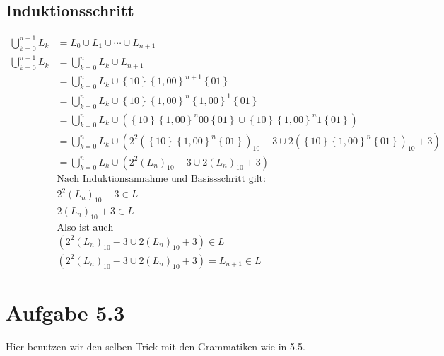 \documentclass{article}
\begin{document}
\subsection*{Induktionsschritt}
\begin{align*}%
\bigcup_{k=0}^{n+1} L_k &= L_0 \cup L_1 \cup \cdots \cup L_{n+1} \\
\bigcup_{k=0}^{n+1} L_k &= \bigcup_{k=0}^{n} L_k \cup L_{n+1} \\
&= \bigcup_{k=0}^{n} L_k \cup \left\{10 \right\} \left\{1,00 \right\}^{n+1} \left\{ 01 \right\} \\
&= \bigcup_{k=0}^{n} L_k \cup \left\{10 \right\} \left\{1,00 \right\}^n \left\{ 1,00 \right\}^1 \left\{ 01 \right\} \\
&= \bigcup_{k=0}^{n} L_k \cup \left( \left\{ 10 \right\} \left\{ 1,00 \right\}^n 00 \left\{ 01 \right\} \cup \left\{ 10 \right\} \left\{ 1,00 \right\}^n 1 \left\{ 01 \right\}  \right) \\
&= \bigcup_{k=0}^{n} L_k \cup \left( 2^2 \left( \left\{ 10 \right\} \left\{ 1,00 \right\}^n \left\{ 01 \right\} \right)_{10} - 3 \cup 2 \left( \left\{10\right\} \left\{1,00\right\}^n \left\{01\right\} \right)_{10} + 3 \right)\\
&= \bigcup_{k=0}^{n} L_k \cup \left( 2^2 \left( L_n \right)_{10} - 3 \cup 2 \left( L_n \right)_{10} + 3 \right) \\
&\text{Nach Induktionsannahme und Basissschritt gilt: } \\
&2^2 \left( L_n \right)_{10} - 3 \in L \\
&2 \left( L_n \right)_{10} + 3 \in L \\
&\text{Also ist auch } \\
&\left( 2^2 \left( L_n \right)_{10} - 3 \cup 2 \left( L_n \right)_{10} + 3 \right) \in L\\
&\left( 2^2 \left( L_n \right)_{10} - 3 \cup 2 \left( L_n \right)_{10} + 3 \right) = L_{n+1} \in L
\end{align*}

\section*{Aufgabe 5.3}
Hier benutzen wir den selben Trick mit den Grammatiken wie in 5.5.
\end{document}
